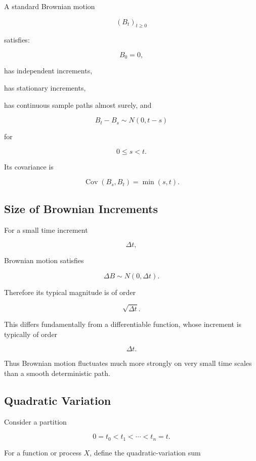 A standard Brownian motion

\[
(B_t)_{t\geq0}
\]

satisfies:

\[
\boxed{
B_0=0,
}
\]

has independent increments,

has stationary increments,

has continuous sample paths almost surely, and

\[
\boxed{
B_t-B_s
\sim
N(0,t-s)
}
\]

for

\[
0\leq s<t.
\]

Its covariance is

\[
\boxed{
\operatorname{Cov}(B_s,B_t)
=
\min(s,t).
}
\]

\subsection{Size of Brownian Increments}
\label{subsec:size-brownian-increments}

For a small time increment

\[
\Delta t,
\]

Brownian motion satisfies

\[
\Delta B
\sim
N(0,\Delta t).
\]

Therefore its typical magnitude is of order

\[
\boxed{
\sqrt{\Delta t}.
}
\]

This differs fundamentally from a differentiable function, whose
increment is typically of order

\[
\Delta t.
\]

Thus Brownian motion fluctuates much more strongly on very small time
scales than a smooth deterministic path.

\subsection{Quadratic Variation}
\label{subsec:quadratic-variation}

Consider a partition

\[
0=t_0<t_1<\cdots<t_n=t.
\]

For a function or process \(X\), define the quadratic-variation sum

